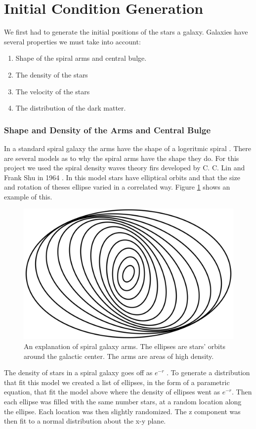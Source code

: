 \documentclass{report}
\begin{document}
\section{Initial Condition Generation}
We first had to generate the initial positions of the stars a galaxy. Galaxies have several properties we must take into account:
\begin{enumerate}
  \item Shape of the spiral arms and central bulge. 
  \item The density of the stars
  \item The velocity of the stars 
  \item The distribution of the dark matter. 
\end{enumerate}
\subsubsection{Shape and Density of the Arms and Central Bulge}
In a standard spiral galaxy the arms have the shape of a logeritmic spiral \cite{structure}. There are several models as to why the spiral arms have the shape they do. For this project we used the spiral density waves theory firs developed by C. C. Lin and Frank Shu in 1964 \cite{Lin}. In this model stars have elliptical orbits and that the size and rotation of theses ellipse varied in a correlated way. Figure \ref{fig:spiral-arms} shows an example of this.
\begin{figure}
\centering
\includegraphics[width=.8\columnwidth]{spiral-arms.png}
\caption{An explanation of spiral galaxy arms.  The ellipses are stars' orbits around the galactic center.  The arms are areas of high density. \label{fig:spiral-arms}}
\end{figure}

The density of stars in a spiral galaxy goes off as $e^{-r}$ \cite{structure}. To generate a distribution that fit this model we created a list of ellipses, in the form of a parametric equation, that fit the model above where the density of ellipses went as $e^{-r}$. Then each ellipse was filled with the same number stars, at a random location along the ellipse. Each location was then slightly randomized. The z component was then fit to a normal distribution about the x-y plane. 
\end{document}
